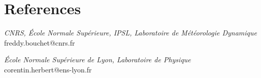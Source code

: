 \documentclass[11pt, a4 paper]{article}
\begin{document}
\section*{References}
\begin{description}[style=multiline,leftmargin=4cm,align=right]
  \item[Freddy Bouchet]
    \emph{CNRS, \'Ecole Normale Sup\'erieure, IPSL, Laboratoire de M\'et\'eorologie Dynamique} \\
    freddy.bouchet@cnrs.fr
  \item[Corentin Herbert]
    \emph{\'Ecole Normale Sup\'erieure de Lyon, Laboratoire de Physique} \\
    corentin.herbert@ens-lyon.fr

\end{description}

% 


\end{document}
